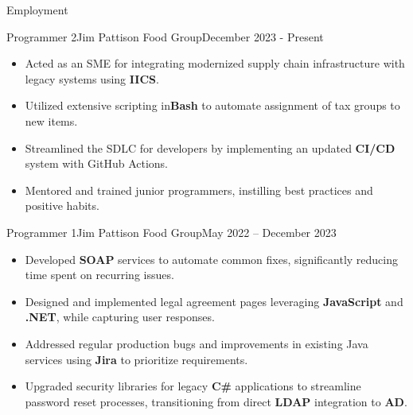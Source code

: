 \documentclass[]{mcdowellcv}
\begin{document}
	\makeheader
	
	\begin{cvsection}{Employment}
		\begin{cvsubsection}{Programmer 2}{Jim Pattison Food Group}{December 2023 - Present}		
			\begin{itemize}
				\item Acted as an SME for integrating modernized supply chain infrastructure with legacy systems using \textbf{IICS}.
				\item Utilized extensive scripting in\textbf{Bash} to automate assignment of tax groups to new items.
				\item Streamlined the SDLC for developers by implementing an updated \textbf{CI/CD} system with GitHub Actions.
				\item Mentored and trained junior programmers, instilling best practices and positive habits.
			\end{itemize}
		\end{cvsubsection}
		
		\begin{cvsubsection}{Programmer 1}{Jim Pattison Food Group}{May 2022 -- December 2023}	
			\begin{itemize}
				\item Developed \textbf{SOAP} services to automate common fixes, significantly reducing time spent on recurring issues.
				\item Designed and implemented legal agreement pages leveraging \textbf{JavaScript} and \textbf{.NET}, while capturing user responses.
				\item Addressed regular production bugs and improvements in existing Java services using \textbf{Jira} to prioritize requirements.
				\item Upgraded security libraries for legacy \textbf{C\#} applications to streamline password reset processes, transitioning from direct \textbf{LDAP} integration to \textbf{AD}.
			\end{itemize}
		\end{cvsubsection}
	\end{cvsection}
	
\end{document}
